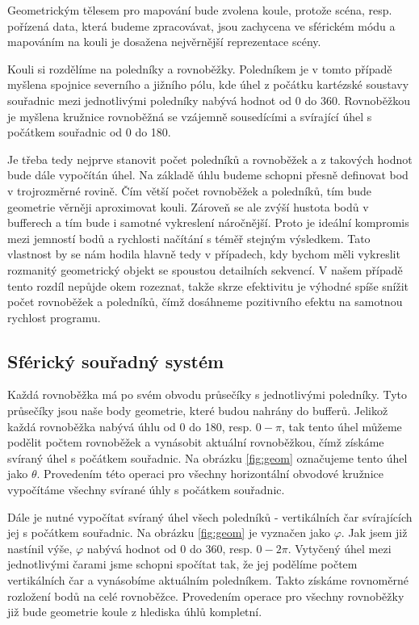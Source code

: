 Geometrickým tělesem pro mapování bude zvolena koule, protože scéna, resp. pořízená data, která budeme zpracovávat, jsou zachycena ve sférickém módu a mapováním na kouli je dosažena nejvěrnější reprezentace scény.

Kouli si rozdělíme na poledníky a rovnoběžky. Poledníkem je v tomto případě myšlena spojnice severního a jižního pólu, kde úhel z počátku kartézské soustavy souřadnic mezi jednotlivými poledníky nabývá hodnot od 0 do 360\degree. Rovnoběžkou je myšlena kružnice  rovnoběžná se vzájemně sousedícími a svírající úhel s počátkem souřadnic od 0 do 180\degree. 

Je třeba tedy nejprve stanovit počet poledníků a rovnoběžek a z takových hodnot bude dále vypočítán úhel. Na základě úhlu budeme schopni přesně definovat bod v trojrozměrné rovině. Čím větší počet rovnoběžek a poledníků, tím bude geometrie věrněji aproximovat kouli. Zároveň se ale zvýší hustota bodů v bufferech a tím bude i samotné vykreslení náročnější. Proto je ideální kompromis mezi jemností bodů a rychlosti načítání s téměř stejným výsledkem. Tato vlastnost by se nám hodila hlavně tedy v případech, kdy bychom měli vykreslit rozmanitý geometrický objekt se spoustou detailních sekvencí. V našem případě tento rozdíl nepůjde okem rozeznat, takže skrze efektivitu je výhodné spíše snížit počet rovnoběžek a poledníků, čímž dosáhneme pozitivního efektu na samotnou rychlost programu.


\subsection{Sférický souřadný systém}

Každá rovnoběžka má po svém obvodu průsečíky s jednotlivými poledníky. Tyto průsečíky jsou naše body geometrie, které budou nahrány do bufferů. Jelikož každá rovnoběžka nabývá úhlu od 0 do 180\degree,  resp. $0-\pi$, tak tento úhel můžeme podělit počtem rovnoběžek a vynásobit aktuální rovnoběžkou, čímž získáme svíraný úhel s počátkem souřadnic. Na obrázku \ref{fig:geom} označujeme tento úhel jako $\theta$. Provedením této operaci pro všechny horizontální obvodové kružnice vypočítáme všechny svírané úhly s počátkem souřadnic. 

Dále je nutné vypočítat svíraný úhel všech poledníků - vertikálních čar svírajících jej s počátkem souřadnic. Na obrázku \ref{fig:geom} je vyznačen jako $\varphi$. Jak jsem již nastínil výše, $\varphi$ nabývá hodnot od 0 do 360\degree, resp. $0-2\pi$. Vytyčený úhel mezi jednotlivými čarami jsme schopni spočítat tak, že jej podělíme počtem vertikálních čar a vynásobíme aktuálním poledníkem. Takto získáme rovnoměrné rozložení bodů na celé rovnoběžce. Provedením  operace pro všechny rovnoběžky již bude geometrie koule z hlediska úhlů kompletní.

